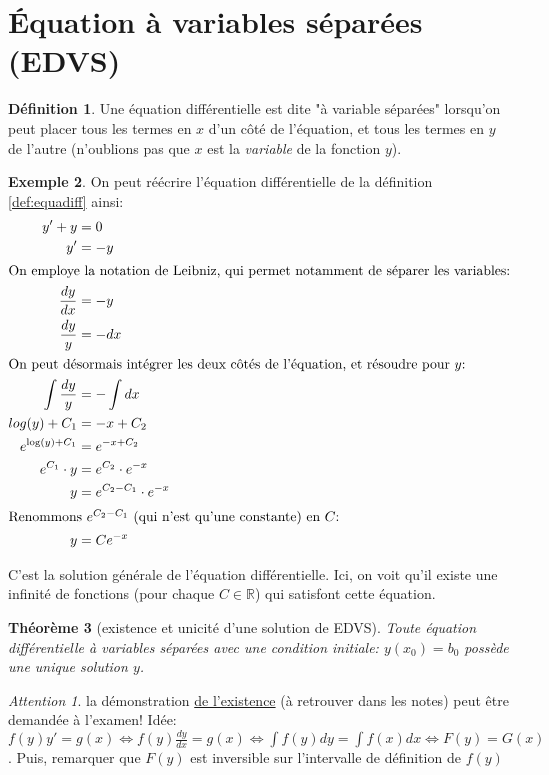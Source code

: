 \documentclass{article}
\theoremstyle{plain}
\newtheorem{thm}{Théorème}
\theoremstyle{definition}
\newtheorem{defn}[thm]{Définition}
\newtheorem{exmp}[thm]{Exemple}
\theoremstyle{remark}
\newtheorem*{attention}{Attention}
\begin{document}

\section{Équation à variables séparées (EDVS)}
\begin{defn}\label{def:edvs}
Une équation différentielle est dite "à variable séparées" lorsqu'on peut placer tous les termes en $x$ d'un côté de l'équation, et tous les termes en $y$ de l'autre (n'oublions pas que $x$ est la \emph{variable} de la fonction $y$).
\end{defn}

\begin{exmp}
On peut réécrire l'équation différentielle de la définition \ref{def:equadiff} ainsi:
	\begin{align*}
		y' + y &= 0 \\
		y' &= -y \\
\intertext{On employe la notation de Leibniz, qui permet notamment de séparer les variables:}
		\dfrac{dy}{dx} &= -y \\
		\dfrac{dy}{y} &= -dx \\
\intertext{On peut désormais intégrer les deux côtés de l'équation, et résoudre pour $y$:}
		\int \dfrac{dy}{y} &= -\int dx \\
		log(y) + C_1 &= -x + C_2 \\
		e^{\log(y) + C_1} &= e^{-x + C_2} \\
		e^{C_1} \cdot y &= e^{C_2} \cdot e^{-x} \\
		y &= e^{C_2 - C_1} \cdot e^{-x} \\
\intertext{Renommons $e^{C_2 - C_1}$ (qui n'est qu'une constante) en $C$:}
		y &= Ce^{-x}
\end{align*}

C'est la solution générale de l'équation différentielle. Ici, on voit qu'il existe une infinité de fonctions (pour chaque $C \in \mathbb{R}$) qui satisfont cette équation.
\end{exmp}

\begin{thm}[existence et unicité d'une solution de EDVS]
Toute équation différentielle à variables séparées avec une condition initiale: $y(x_0) = b_0$ possède une unique solution $y$.
\end{thm}
\begin{attention} la démonstration \underline{de l'existence} (à retrouver dans les notes) peut être demandée à l'examen! Idée: $f(y)y' = g(x) \iff f(y)\frac{dy}{dx} = g(x) \iff \int f(y)dy = \int f(x)dx \iff F(y) = G(x)$. Puis, remarquer que $F(y)$ est inversible sur l'intervalle de définition de $f(y)$
\end{attention}
\end{document}
